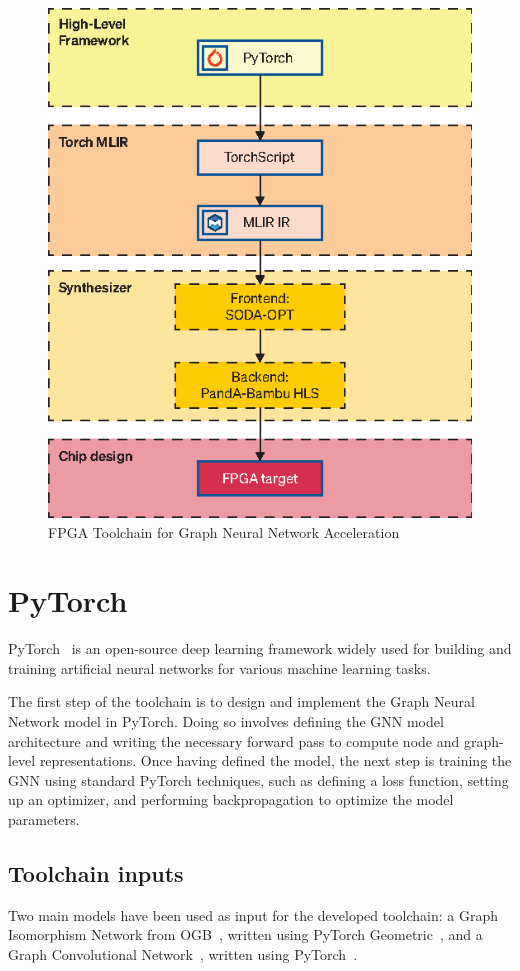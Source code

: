 \begin{figure}[t]
    \centering
    \includegraphics[height=0.6\textwidth]{Images/toolchain}
    \caption{FPGA Toolchain for Graph Neural Network Acceleration}
    \label{fig:toolchain}
\end{figure}

\section{PyTorch}
\label{sec:toolchain-pytorch}%

PyTorch~\cite{DBLP:journals/corr/abs-1912-01703} is an open-source deep learning framework widely used for building and training artificial neural networks for various machine learning tasks.

The first step of the toolchain is to design and implement the Graph Neural Network model in PyTorch.
Doing so involves defining the GNN model architecture and writing the necessary forward pass to compute node and graph-level representations.
Once having defined the model, the next step is training the GNN using standard PyTorch techniques, such as defining a loss function, setting up an optimizer, and performing backpropagation to optimize the model parameters.

\subsection{Toolchain inputs}
\label{subsec:toolchain-inputs}%

Two main models have been used as input for the developed toolchain: a Graph Isomorphism Network from OGB~\cite{NEURIPS2020_fb60d411, ogb_gnn_models}, written using PyTorch Geometric~\cite{DBLP:journals/corr/abs-1903-02428}, and a Graph Convolutional Network~\cite{DBLP:journals/corr/KipfW16, pygcn}, written using PyTorch~\cite{DBLP:journals/corr/abs-1912-01703}.

